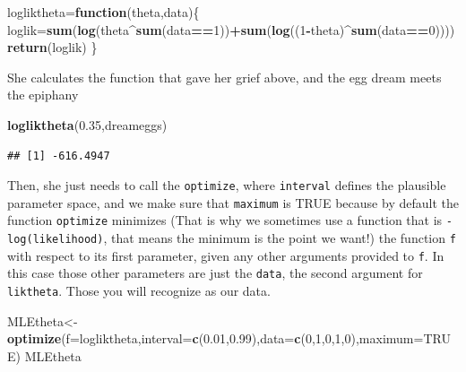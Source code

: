 \documentclass[
]{book}
\newenvironment{Shaded}{\begin{snugshade}}{\end{snugshade}}
\newcommand{\ControlFlowTok}[1]{\textcolor[rgb]{0.13,0.29,0.53}{\textbf{#1}}}
\newcommand{\DataTypeTok}[1]{\textcolor[rgb]{0.13,0.29,0.53}{#1}}
\newcommand{\DecValTok}[1]{\textcolor[rgb]{0.00,0.00,0.81}{#1}}
\newcommand{\FloatTok}[1]{\textcolor[rgb]{0.00,0.00,0.81}{#1}}
\newcommand{\KeywordTok}[1]{\textcolor[rgb]{0.13,0.29,0.53}{\textbf{#1}}}
\newcommand{\NormalTok}[1]{#1}
\newcommand{\OperatorTok}[1]{\textcolor[rgb]{0.81,0.36,0.00}{\textbf{#1}}}
\newcommand{\OtherTok}[1]{\textcolor[rgb]{0.56,0.35,0.01}{#1}}
\begin{document}
\begin{Shaded}
\begin{Highlighting}[]
\NormalTok{logliktheta=}\ControlFlowTok{function}\NormalTok{(theta,data)\{}
\NormalTok{  loglik=}\KeywordTok{sum}\NormalTok{(}\KeywordTok{log}\NormalTok{(theta}\OperatorTok{^}\KeywordTok{sum}\NormalTok{(data}\OperatorTok{==}\DecValTok{1}\NormalTok{))}\OperatorTok{+}\KeywordTok{sum}\NormalTok{(}\KeywordTok{log}\NormalTok{((}\DecValTok{1}\OperatorTok{-}\NormalTok{theta)}\OperatorTok{^}\KeywordTok{sum}\NormalTok{(data}\OperatorTok{==}\DecValTok{0}\NormalTok{))))}
  \KeywordTok{return}\NormalTok{(loglik)}
\NormalTok{\}}
\end{Highlighting}
\end{Shaded}

She calculates the function that gave her grief above, and the egg dream meets the epiphany

\begin{Shaded}
\begin{Highlighting}[]
\KeywordTok{logliktheta}\NormalTok{(}\FloatTok{0.35}\NormalTok{,dreameggs)}
\end{Highlighting}
\end{Shaded}

\begin{verbatim}
## [1] -616.4947
\end{verbatim}

Then, she just needs to call the \texttt{optimize}, where \texttt{interval} defines the plausible parameter space, and we make sure that \texttt{maximum} is TRUE because by default the function \texttt{optimize} minimizes (That is why we sometimes use a function that is \texttt{-log(likelihood)}, that means the minimum is the point we want!) the function \texttt{f} with respect to its first parameter, given any other arguments provided to \texttt{f}. In this case those other parameters are just the \texttt{data}, the second argument for \texttt{liktheta}. Those you will recognize as our data.

\begin{Shaded}
\begin{Highlighting}[]
\NormalTok{MLEtheta<-}\KeywordTok{optimize}\NormalTok{(}\DataTypeTok{f=}\NormalTok{logliktheta,}\DataTypeTok{interval=}\KeywordTok{c}\NormalTok{(}\FloatTok{0.01}\NormalTok{,}\FloatTok{0.99}\NormalTok{),}\DataTypeTok{data=}\KeywordTok{c}\NormalTok{(}\DecValTok{0}\NormalTok{,}\DecValTok{1}\NormalTok{,}\DecValTok{0}\NormalTok{,}\DecValTok{1}\NormalTok{,}\DecValTok{0}\NormalTok{),}\DataTypeTok{maximum=}\OtherTok{TRUE}\NormalTok{)}
\NormalTok{MLEtheta}
\end{Highlighting}
\end{Shaded}
\end{document}
